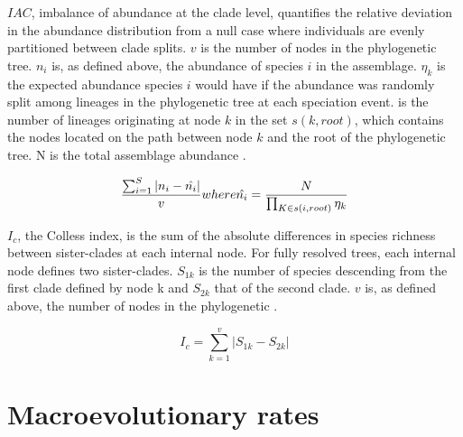 \documentclass[]{book}
\newenvironment{Shaded}{\begin{snugshade}}{\end{snugshade}}
\newcommand{\KeywordTok}[1]{\textcolor[rgb]{0.13,0.29,0.53}{\textbf{{#1}}}}
\newcommand{\DecValTok}[1]{\textcolor[rgb]{0.00,0.00,0.81}{{#1}}}
\newcommand{\StringTok}[1]{\textcolor[rgb]{0.31,0.60,0.02}{{#1}}}
\newcommand{\CommentTok}[1]{\textcolor[rgb]{0.56,0.35,0.01}{\textit{{#1}}}}
\newcommand{\ControlFlowTok}[1]{\textcolor[rgb]{0.13,0.29,0.53}{\textbf{{#1}}}}
\newcommand{\OperatorTok}[1]{\textcolor[rgb]{0.81,0.36,0.00}{\textbf{{#1}}}}
\newcommand{\NormalTok}[1]{{#1}}
\theoremstyle{definition}
\theoremstyle{definition}
\theoremstyle{definition}
\theoremstyle{remark}
\begin{document}
\(IAC\), imbalance of abundance at the clade level, quantifies the
relative deviation in the abundance distribution from a null case where
individuals are evenly partitioned between clade splits. \(v\) is the
number of nodes in the phylogenetic tree. \(n_{i}\) is, as defined
above, the abundance of species \(i\) in the assemblage. \(\eta_{k}\) is
the expected abundance species \(i\) would have if the abundance was
randomly split among lineages in the phylogenetic tree at each
speciation event. is the number of lineages originating at node \(k\) in
the set \(s(k,root)\), which contains the nodes located on the path
between node \(k\) and the root of the phylogenetic tree. N is the total
assemblage abundance \citep{Cadotte2010}.

\[
\dfrac{\sum_{i=1}^{S}  |n_{i} - \hat{n_{i}}|}
{v} \\
\ \\
where \\ 
\ \\
\hat{n_{i}} = \dfrac{N}{\prod_{K \in s(i, root)}\eta_{k}}
\]

\(I_{c}\), the Colless index, is the sum of the absolute differences in
species richness between sister-clades at each internal node. For fully
resolved trees, each internal node defines two sister-clades. \(S_{1k}\)
is the number of species descending from the first clade defined by node
k and \(S_{2k}\) that of the second clade. \(v\) is, as defined above,
the number of nodes in the phylogenetic \citep{Colless1982}.

\[
I_{c} = \sum_{k=1}^{v} |S_{1k} - S_{2k}|
\]

\hypertarget{macroevolutionary-rates}{\section{Macroevolutionary
rates}\label{macroevolutionary-rates}}

\begin{Shaded}
\end{Shaded}
\end{document}
